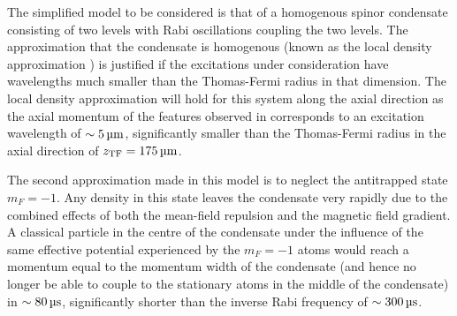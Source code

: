 The simplified model to be considered is that of a homogenous spinor condensate consisting of two levels with Rabi oscillations coupling the two levels. The approximation that the condensate is homogenous (known as the local density approximation \cite{Stamper-Kurn:1999,Zambelli:2000}) is justified if the excitations under consideration have wavelengths much smaller than the Thomas-Fermi radius in that dimension. The local density approximation will hold for this system along the axial direction as the axial momentum of the features observed in  corresponds to an excitation wavelength of $\sim \unit[5]{\micro m}$, significantly smaller than the Thomas-Fermi radius in the axial direction of $z_\text{TF} = \unit[175]{\micro m}$. 

The second approximation made in this model is to neglect the antitrapped state $m_F=-1$. Any density in this state leaves the condensate very rapidly due to the combined effects of both the mean-field repulsion and the magnetic field gradient. A classical particle in the centre of the condensate under the influence of the same effective potential experienced by the $m_F=-1$ atoms would reach a momentum equal to the momentum width of the condensate (and hence no longer be able to couple to the stationary atoms in the middle of the condensate) in $\sim\unit[80]{\micro s}$, significantly shorter than the inverse Rabi frequency of $\sim \unit[300]{\micro s}$.

